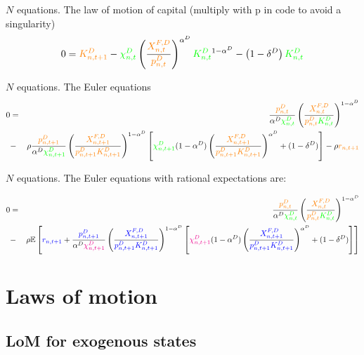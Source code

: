 \documentclass[12pt, bibtotoc, tablecaptionabove, figurecaptionabove, fleqn]{article}
\newcommand{\cl}[1]{{\color{orange}{#1}}}
\newcommand{\st}[1]{{\color{green}{#1}}}
\newcommand{\stnext}[1]{{\color{magenta}{#1}}}
\newcommand{\clnext}[1]{{\color{blue}{#1}}}
\begin{document}
\noindent $N$ equations. The law of motion of capital (multiply with p in code to avoid a singularity)
\begin{equation}
0 = \cl{K^D_{n,t+1}} - \st{\chi^D_{n,t}} \left( \frac{\cl{X_{n,t}^{F,D}}}{\cl{p_{n,t}^D}} \right)^{\alpha^D} \st{K^D_{n,t}}^{1-\alpha^D} - \left(1 - \delta^D\right) \st{K^D_{n,t}}
\end{equation}

\noindent $N$ equations. The Euler equations
\begin{eqnarray}
0 &=& \frac{\cl{p_{n, t}^{D}}}{\alpha^D \st{\chi^D_{n, t}}}\left(\frac{\cl{X_{n, t}^{F,D}}}{\cl{p_{n, t}^{D}} \st{K^D_{n, t}}}\right)^{1-\alpha^D} \\
&-& \rho \frac{\cl{p_{n, t+1}^{D}}}{\alpha^D \st{\chi^D_{n, t+1}}}\left(\frac{\cl{X_{n, t+1}^{F,D}}}{\cl{p_{n, t+1}^{D}} \cl{K^D_{n, t+1}}}\right)^{1-\alpha^D}\left[\st{\chi^D_{n, t+1}}(1-\alpha^D)\left(\frac{\cl{X_{n, t+1}^{F,D}}}{\cl{p_{n, t+1}^{D}} \cl{K^D_{n, t+1}}}\right)^{\alpha^D}+(1-\delta^D)\right]-\rho \cl{r_{n, t+1}}\nonumber
\end{eqnarray}

\noindent $N$ equations. The Euler equations with rational expectations are:

\begin{eqnarray}
	0 &=& \frac{\cl{p_{n, t}^{D}}}{\alpha^D \st{\chi^D_{n, t}}}\left(\frac{\cl{X_{n, t}^{F,D}}}{\cl{p_{n, t}^{D}} \st{K^D_{n, t}}}\right)^{1-\alpha^D} \\
	&-& \rho \mathbb{E}\left[\clnext{r_{n, t+1}} + \frac{\clnext{p_{n, t+1}^{D}}}{\alpha^D \stnext{\chi^D_{n, t+1}}}\left(\frac{\clnext{X_{n, t+1}^{F,D}}}{\clnext{p_{n, t+1}^{D}} \clnext{K^D_{n, t+1}}}\right)^{1-\alpha^D}\left[\stnext{\chi^D_{n, t+1}}(1-\alpha^D)\left(\frac{\clnext{X_{n, t+1}^{F,D}}}{\clnext{p_{n, t+1}^{D}} \clnext{K^D_{n, t+1}}}\right)^{\alpha^D}+(1-\delta^D)\right]\right]\nonumber 
\end{eqnarray}



\section{Laws of motion}

\subsection{LoM for exogenous states}
\end{document}
